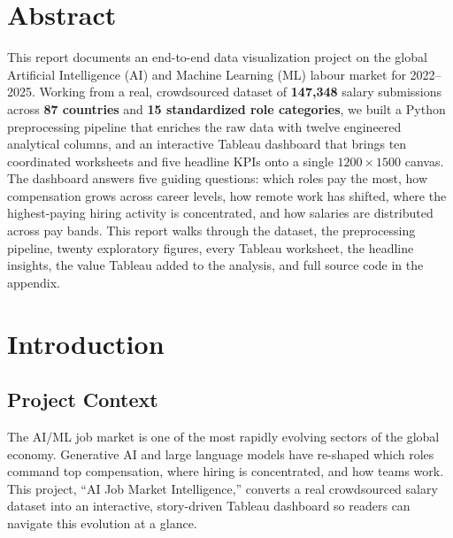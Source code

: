 \documentclass[11pt,a4paper,oneside]{report}
\begin{document}
\chapter*{Abstract}
This report documents an end-to-end data visualization project on the global Artificial Intelligence (AI) and Machine Learning (ML) labour market for 2022--2025. Working from a real, crowdsourced dataset of \textbf{147,348} salary submissions across \textbf{87 countries} and \textbf{15 standardized role categories}, we built a Python preprocessing pipeline that enriches the raw data with twelve engineered analytical columns, and an interactive Tableau dashboard that brings ten coordinated worksheets and five headline KPIs onto a single \(1200 \times 1500\) canvas. The dashboard answers five guiding questions: which roles pay the most, how compensation grows across career levels, how remote work has shifted, where the highest-paying hiring activity is concentrated, and how salaries are distributed across pay bands. This report walks through the dataset, the preprocessing pipeline, twenty exploratory figures, every Tableau worksheet, the headline insights, the value Tableau added to the analysis, and full source code in the appendix.

\tableofcontents
\listoffigures
\listoftables

\newpage
{}

\chapter{Introduction}

\section{Project Context}
The AI/ML job market is one of the most rapidly evolving sectors of the global economy. Generative AI and large language models have re-shaped which roles command top compensation, where hiring is concentrated, and how teams work. This project, ``AI Job Market Intelligence,'' converts a real crowdsourced salary dataset into an interactive, story-driven Tableau dashboard so readers can navigate this evolution at a glance.
\end{document}
